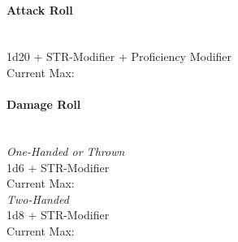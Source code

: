 \documentclass[letterpaper,openany,oneside,twocolumn]{book}
\begin{document}
\paragraph*{Attack Roll} \hfill\\
1d20 + STR-Modifier + Proficiency Modifier \\
Current Max: 
\paragraph*{Damage Roll} \hfill\\
\textit{One-Handed or Thrown} \\
1d6 + STR-Modifier \\
Current Max: \\
\textit{Two-Handed} \\
1d8 + STR-Modifier \\
Current Max: 
\end{document}
